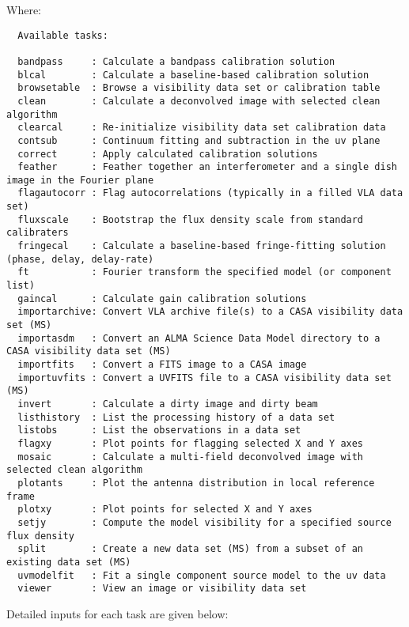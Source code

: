 Where:

\small
\begin{verbatim}
  Available tasks: 

  bandpass     : Calculate a bandpass calibration solution
  blcal        : Calculate a baseline-based calibration solution
  browsetable  : Browse a visibility data set or calibration table
  clean        : Calculate a deconvolved image with selected clean algorithm
  clearcal     : Re-initialize visibility data set calibration data
  contsub      : Continuum fitting and subtraction in the uv plane
  correct      : Apply calculated calibration solutions
  feather      : Feather together an interferometer and a single dish image in the Fourier plane
  flagautocorr : Flag autocorrelations (typically in a filled VLA data set)
  fluxscale    : Bootstrap the flux density scale from standard calibraters
  fringecal    : Calculate a baseline-based fringe-fitting solution (phase, delay, delay-rate)
  ft           : Fourier transform the specified model (or component list)
  gaincal      : Calculate gain calibration solutions
  importarchive: Convert VLA archive file(s) to a CASA visibility data set (MS)
  importasdm   : Convert an ALMA Science Data Model directory to a CASA visibility data set (MS)
  importfits   : Convert a FITS image to a CASA image
  importuvfits : Convert a UVFITS file to a CASA visibility data set (MS)
  invert       : Calculate a dirty image and dirty beam
  listhistory  : List the processing history of a data set
  listobs      : List the observations in a data set
  flagxy       : Plot points for flagging selected X and Y axes
  mosaic       : Calculate a multi-field deconvolved image with selected clean algorithm
  plotants     : Plot the antenna distribution in local reference frame
  plotxy       : Plot points for selected X and Y axes
  setjy        : Compute the model visibility for a specified source flux density
  split        : Create a new data set (MS) from a subset of an existing data set (MS)
  uvmodelfit   : Fit a single component source model to the uv data
  viewer       : View an image or visibility data set
\end{verbatim}
\normalsize

Detailed inputs for each task are given below:


